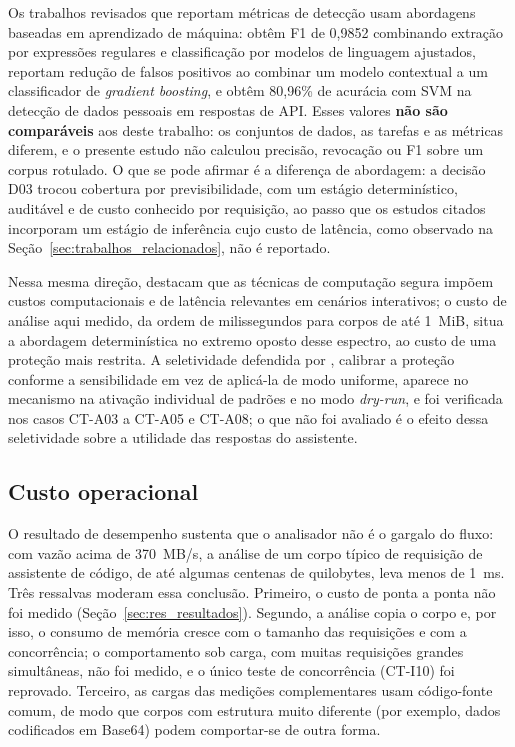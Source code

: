 Os trabalhos revisados que reportam métricas de detecção usam abordagens baseadas em aprendizado de máquina:  obtêm F1 de 0,9852 combinando extração por expressões regulares e classificação por modelos de linguagem ajustados,  reportam redução de falsos positivos ao combinar um modelo contextual a um classificador de \textit{gradient boosting}, e  obtêm 80,96\% de acurácia com SVM na detecção de dados pessoais em respostas de API. Esses valores \textbf{não são comparáveis} aos deste trabalho: os conjuntos de dados, as tarefas e as métricas diferem, e o presente estudo não calculou precisão, revocação ou F1 sobre um corpus rotulado. O que se pode afirmar é a diferença de abordagem: a decisão D03 trocou cobertura por previsibilidade, com um estágio determinístico, auditável e de custo conhecido por requisição, ao passo que os estudos citados incorporam um estágio de inferência cujo custo de latência, como observado na Seção~\ref{sec:trabalhos_relacionados}, não é reportado.

Nessa mesma direção,  destacam que as técnicas de computação segura impõem custos computacionais e de latência relevantes em cenários interativos; o custo de análise aqui medido, da ordem de milissegundos para corpos de até 1~MiB, situa a abordagem determinística no extremo oposto desse espectro, ao custo de uma proteção mais restrita. A seletividade defendida por , calibrar a proteção conforme a sensibilidade em vez de aplicá-la de modo uniforme, aparece no mecanismo na ativação individual de padrões e no modo \textit{dry-run}, e foi verificada nos casos CT-A03 a CT-A05 e CT-A08; o que não foi avaliado é o efeito dessa seletividade sobre a utilidade das respostas do assistente.

\subsection{Custo operacional}

O resultado de desempenho sustenta que o analisador não é o gargalo do fluxo: com vazão acima de 370~MB/s, a análise de um corpo típico de requisição de assistente de código, de até algumas centenas de quilobytes, leva menos de 1~ms. Três ressalvas moderam essa conclusão. Primeiro, o custo de ponta a ponta não foi medido (Seção~\ref{sec:res_resultados}). Segundo, a análise copia o corpo e, por isso, o consumo de memória cresce com o tamanho das requisições e com a concorrência; o comportamento sob carga, com muitas requisições grandes simultâneas, não foi medido, e o único teste de concorrência (CT-I10) foi reprovado. Terceiro, as cargas das medições complementares usam código-fonte comum, de modo que corpos com estrutura muito diferente (por exemplo, dados codificados em Base64) podem comportar-se de outra forma.


